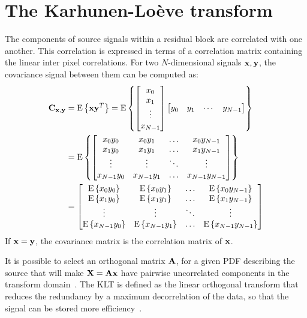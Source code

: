 \documentclass[11pt,a4paper,openright,twoside]{book}
\numberwithin{equation}{section} %
\numberwithin{figure}{section} %
\numberwithin{table}{section} %
\begin{document}
\section{The Karhunen-Loève transform}
\label{sec:the_karhunen_loeve_transform}
The components of source signals within a residual block are correlated with
one another.
This correlation is expressed in terms of a correlation matrix containing the
linear inter pixel correlations.
For two $N$-dimensional signals $\mathbf{x},\mathbf{y}$, the covariance signal between them
can be computed as:
\begin{align}
	\nonumber
	\mathbf{C}_{\mathbf{x},\mathbf{y}} & = \text{E}\left\{\mathbf{x}\mathbf{y}^T\right\} =
	\text{E}\left\{
	\begin{bmatrix}
		x_0 \\ x_1 \\ \vdots \\ x_{N-1}
	\end{bmatrix}
	\begin{bmatrix}
		y_0 & y_1 & \cdots & y_{N-1}
	\end{bmatrix}
	\right\} \\
	& = \text{E}\left\{
	\begin{bmatrix}
		x_0y_0 & x_0y_1 & \hdots & x_{0}y_{N-1} \\
		x_1y_0 & x_1y_1 & \hdots & x_{1}y_{N-1} \\
		\vdots & \vdots & \ddots & \vdots \\
		x_{N-1}y_0 & x_{N-1}y_1 & \hdots & x_{N-1}y_{N-1}
	\end{bmatrix}
	\right\} \\ \nonumber
	& =
	\begin{bmatrix}
		\text{E}\left\{x_0y_0\right\} & \text{E}\left\{x_0y_1\right\} & \hdots & \text{E}\left\{x_{0}y_{N-1}\right\} \\
		\text{E}\left\{x_1y_0\right\} & \text{E}\left\{x_1y_1\right\} & \hdots & \text{E}\left\{x_{1}y_{N-1}\right\} \\
		\vdots & \vdots & \ddots & \vdots \\
		\text{E}\left\{x_{N-1}y_0\right\} & \text{E}\left\{x_{N-1}y_1\right\} & \hdots & \text{E}\left\{x_{N-1}y_{N-1}\right\}
	\end{bmatrix}
\end{align}
If $\mathbf{x}=\mathbf{y}$, the covariance matrix is the correlation matrix of $\mathbf{x}$.

It is possible to select an orthogonal matrix $\mathbf{A}$, for a given \ac{PDF}
describing the source that will make $\mathbf{X}=\mathbf{A}\mathbf{x}$ have pairwise uncorrelated
components in the transform domain~\cite{gersho-92-vector-quantization}.
The \ac{KLT} is defined as the linear orthogonal transform that reduces the
redundancy by a maximum decorrelation of the data, so that the signal can be
stored more efficiency~\cite{rao-01-transform-data-compression-book}.
\end{document}
